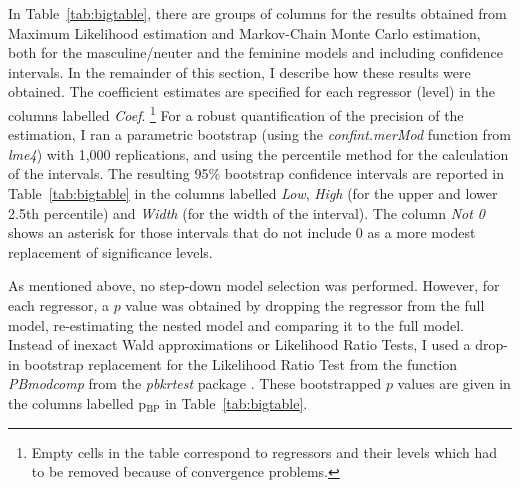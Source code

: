 \documentclass[USenglish]{article}
\newcommand{\Sub}[1]{\ensuremath{\mathrm{_{#1}}}}
\begin{document}
In Table~\ref{tab:bigtable}, there are groups of columns for the results obtained from Maximum Likelihood estimation and Markov-Chain Monte Carlo estimation, both for the masculine\slash neuter and the feminine models and including confidence intervals.
In the remainder of this section, I describe how these results were obtained.
The coefficient estimates are specified for each regressor (level) in the columns labelled \textit{Coef}.%
\footnote{Empty cells in the table correspond to regressors and their levels which had to be removed because of convergence problems.}
For a robust quantification of the precision of the estimation, I ran a parametric bootstrap (using the \textit{confint.merMod} function from \textit{lme4}) with 1,000 replications, and using the percentile method for the calculation of the intervals.
The resulting 95\% bootstrap confidence intervals are reported in Table~\ref{tab:bigtable} in the columns labelled \textit{Low}, \textit{High} (for the upper and lower 2.5th percentile) and \textit{Width} (for the width of the interval).
The column \textit{Not 0} shows an asterisk for those intervals that do not include 0 as a more modest replacement of significance levels.

As mentioned above, no step-down model selection was performed.
However, for each regressor, a $p$ value was obtained by dropping the regressor from the full model, re-estimating the nested model and comparing it to the full model.
Instead of inexact Wald approximations or Likelihood Ratio Tests, I used a drop-in bootstrap replacement for the Likelihood Ratio Test from the function \textit{PBmodcomp} from the \textit{pbkrtest} package \citep{HalekohHojsgaard2014}.
These bootstrapped $p$ values are given in the columns labelled p\Sub{BP} in Table~\ref{tab:bigtable}.
\end{document}
